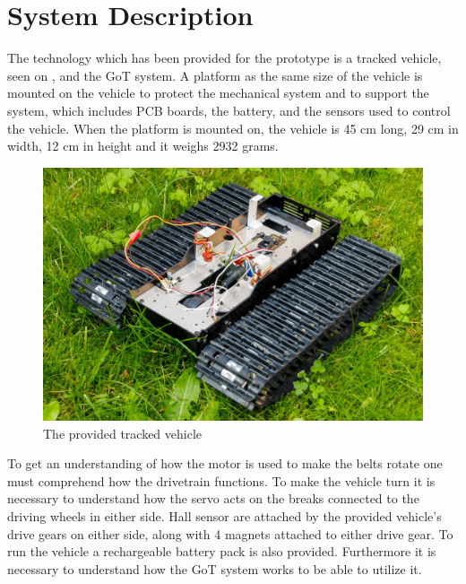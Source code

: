 \section{System Description}
\label{sec:Vehicledescription}
The technology which has been provided for the prototype is a tracked vehicle, seen on , and the GoT system. A platform as the same size of the vehicle is mounted on the vehicle to protect the mechanical system and to support the system, which includes PCB boards, the battery, and the sensors used to control the vehicle. When the platform is mounted on, the vehicle is 45 cm long, 29 cm in width, 12 cm in height and it weighs 2932 grams.\\
%
\begin{figure}[H]
	\centering
	\includegraphics[scale=0.6]{figures/BeltVehicle.jpg}
	\caption{The provided tracked vehicle}
	\label{TrackedVehicle}
\end{figure}
%
To get an understanding of how the motor is used to make the belts rotate one must comprehend how the drivetrain functions. To make the vehicle turn it is necessary to understand how the servo acts on the breaks connected to the driving wheels in either side. Hall sensor are attached by the provided vehicle's drive gears on either side, along with 4 magnets attached to either drive gear. To run the vehicle a rechargeable battery pack is also provided. Furthermore it is necessary to understand how the GoT system works to be able to utilize it.